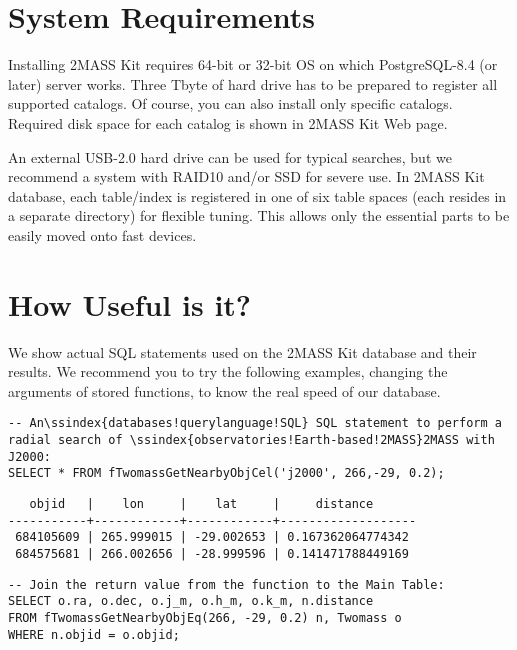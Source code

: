 \section{System Requirements}

Installing 2MASS Kit requires 64-bit or 32-bit OS on which PostgreSQL-8.4 (or later) server works. Three Tbyte of hard drive has to be prepared to register all supported catalogs. Of course, you can also install only specific catalogs. Required disk space for each catalog is shown in 2MASS Kit Web page.

An external USB-2.0 hard drive can be used for typical searches, but we recommend a system with RAID10 and/or SSD for severe use. In 2MASS Kit database, each table/index is registered in one of six table spaces (each resides in a separate directory) for flexible tuning. This allows only the essential parts to be easily moved onto fast devices.


\section{How Useful is it?}

We show actual SQL statements used on the 2MASS Kit database and their results. We recommend you to try the following examples, changing the arguments of stored functions, to know the real speed of our database.

\begin{verbatim}
-- An\ssindex{databases!querylanguage!SQL} SQL statement to perform a radial search of \ssindex{observatories!Earth-based!2MASS}2MASS with J2000:
SELECT * FROM fTwomassGetNearbyObjCel('j2000', 266,-29, 0.2);
\end{verbatim}

{\small
\begin{verbatim}
   objid   |    lon     |    lat     |     distance      
-----------+------------+------------+-------------------
 684105609 | 265.999015 | -29.002653 | 0.167362064774342
 684575681 | 266.002656 | -28.999596 | 0.141471788449169
\end{verbatim}
}

\begin{verbatim}
-- Join the return value from the function to the Main Table:
SELECT o.ra, o.dec, o.j_m, o.h_m, o.k_m, n.distance
FROM fTwomassGetNearbyObjEq(266, -29, 0.2) n, Twomass o
WHERE n.objid = o.objid;
\end{verbatim}

